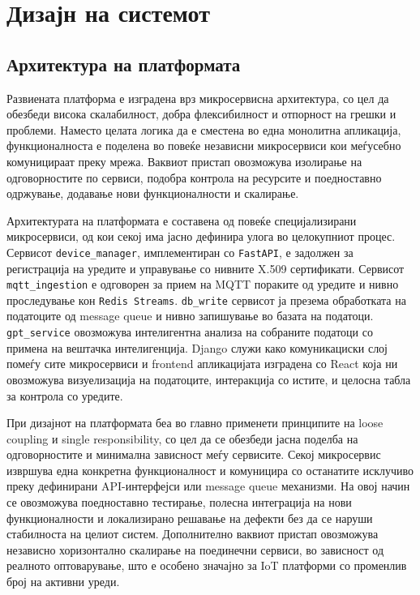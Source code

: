 \newpage

\section{Дизајн на системот}

\subsection{Архитектура на платформата}

Развиената платформа е изградена врз микросервисна архитектура, со цел
да обезбеди висока скалабилност, добра флексибилност и отпорност на
грешки и проблеми. Наместо целата логика да е сместена во една монолитна
апликација, функционалноста е поделена во повеќе независни микросервиси
кои меѓусебно комуницираат преку мрежа. Ваквиот пристап овозможува
изолирање на одговорностите по сервиси, подобра контрола на ресурсите и
поедноставно одржување, додавање нови функционалности и скалирање.

Архитектурата на платформата е составена од повеќе специјализирани
микросервиси, од кои секој има јасно дефинира улога во целокупниот
процес. Сервисот \texttt{device\_manager}, имплементиран со \texttt{FastAPI}, е задолжен
за регистрација на уредите и управување со нивните X.509 сертификати.
Сервисот \texttt{mqtt\_ingestion} е одговорен за прием на MQTT пораките од
уредите и нивно проследување кон \texttt{Redis Streams}. \texttt{db\_write} сервисот ја
презема обработката на податоците од message queue и нивно запишување во
базата на податоци. \texttt{gpt\_service} овозможува интелигентна анализа на
собраните податоци со примена на вештачка интелигенција. Django служи
како комуникациски слој помеѓу сите микросервиси и frontend апликацијата
изградена со React која ни овозможува визуелизација на податоците,
интеракција со истите, и целосна табла за контрола со уредите.

При дизајнот на платформата беа во главно применети принципите на loose
coupling и single responsibility, со цел да се обезбеди јасна поделба на
одговорностите и минимална зависност меѓу сервисите. Секој микросервис
извршува една конкретна функционалност и комуницира со останатите
исклучиво преку дефинирани API-интерфејси или message queue механизми.
На овој начин се овозможува поедноставно тестирање, полесна интеграција
на нови функционалности и локализирано решавање на дефекти без да се
наруши стабилноста на целиот систем. Дополнително ваквиот пристап
овозможува независно хоризонтално скалирање на поединечни сервиси, во
зависност од реалното оптоварување, што е особено значајно за IoT
платформи со променлив број на активни уреди.

